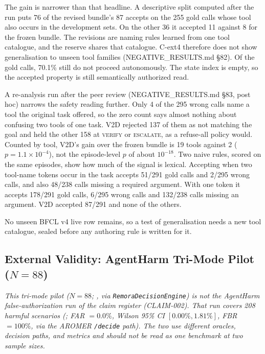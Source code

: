 \documentclass[10pt,twocolumn]{article}
\begin{document}
The gain is narrower than that headline. A descriptive split computed after
the run puts 76 of the revised bundle's 87 accepts on the 255 gold calls
whose tool also occurs in the development sets. On the other 36 it accepted
11 against 8 for the frozen bundle. The revisions are naming rules learned
from one tool catalogue, and the reserve shares that catalogue. C-ext4
therefore does not show generalisation to unseen tool families
(NEGATIVE\_RESULTS.md \S82). Of the gold calls, 70.1\% still do not proceed
autonomously. The state
index is empty, so the accepted property is still semantically authorized
read.

A re-analysis run after the peer review (NEGATIVE\_RESULTS.md \S83, post
hoc) narrows the safety reading further. Only 4 of the 295 wrong calls name
a tool the original task offered, so the zero count says almost nothing
about confusing two tools of one task. V2D rejected 137 of them as not
matching the goal and held the other 158 at \textsc{verify} or
\textsc{escalate}, as a refuse-all policy would. Counted by tool, V2D's gain
over the frozen bundle is 19 tools against 2 ($p = 1.1\times10^{-4}$), not
the episode-level $p$ of about $10^{-18}$. Two naive rules, scored on the
same episodes, show how much of the signal is lexical. Accepting when two
tool-name tokens occur in the task accepts 51/291 gold calls and 2/295 wrong
calls, and also 48/238 calls missing a required argument. With one token it
accepts 178/291 gold calls, 6/295 wrong calls and 132/238 calls missing an
argument. V2D accepted 87/291 and none of the others.

No unseen BFCL v4 live row remains, so a test of generalisation needs
a new tool catalogue, sealed before any authoring rule is written for it.

\subsection{External Validity: AgentHarm Tri-Mode Pilot (\texorpdfstring{$N=88$}{N=88})}
\label{sec:agentharm}

\emph{This tri-mode pilot ($N=88$;
, via
\texttt{RemoraDecisionEngine}) is not the AgentHarm false-authorization run of the claim register
(CLAIM-002). That run covers 208 harmful scenarios
(; FAR $=0.0\%$,
Wilson 95\% CI $[0.00\%, 1.81\%]$, FBR $=100\%$, via the AROMER
\texttt{/decide} path). The two use different oracles, decision paths,
and metrics and should not be read as one benchmark at two sample
sizes.}
\end{document}
